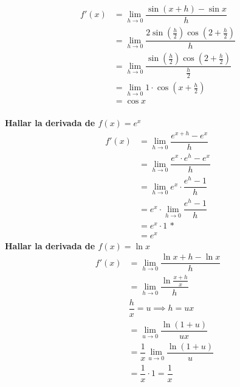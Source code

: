 \documentclass[12pt,a4paper,fleqn]{article}
\begin{document}
\begin{align*}
	f'(x) & =\lim_{h\to0}\dfrac{\sin (x+h)-\sin x}{h}                                \\
	      & =\lim_{h\to0}\dfrac{2\sin (\frac{h}{2})\cos (2+\frac{h}{2})}{h}          \\
	      & =\lim_{h\to0}\dfrac{\sin (\frac{h}{2})\cos (2+\frac{h}{2})}{\frac{h}{2}} \\
	      & =\lim_{h\to0}1\cdot\cos(x+\frac{h}{2})                                   \\
	      & =\cos x
\end{align*}\\[10pt]
\textbf{Hallar la derivada de $f(x)= e^x$}
\begin{align*}
	f'(x) & = \lim_{h \to 0} \dfrac{e^{x+h} - e^x}{h}       \\
	      & = \lim_{h \to 0} \dfrac{e^x \cdot e^h - e^x}{h} \\
	      & = \lim_{h \to 0} e^x \cdot \dfrac{e^h - 1}{h}   \\
	      & = e^x \cdot \lim_{h \to 0} \dfrac{e^h - 1}{h}   \\
	      & = e^x \cdot 1 \text{ *}                         \\
	      & = e^x
\end{align*}
\textbf{Hallar la derivada de $f(x)= \ln x$}
\begin{align*}
	f'(x) & = \lim_{h \to 0} \dfrac{\ln{x+h} - \ln x}{h}      \\
	      & = \lim_{h \to 0} \dfrac{\ln{\frac{x+h}{x}}}{h}    \\
	      & \dfrac{h}{x}=u \implies h=ux                      \\
	      & = \lim_{u \to 0} \dfrac{\ln (1+u)}{ux}            \\
	      & = \dfrac{1}{x}\lim_{u \to 0} \dfrac{\ln (1+u)}{u} \\
	      & = \dfrac{1}{x}\cdot 1 = \dfrac{1}{x}              \\
\end{align*}
\end{document}
